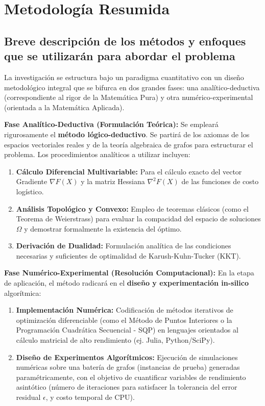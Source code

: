 \section{Metodología Resumida}

\subsection{Breve descripción de los métodos y enfoques que se utilizarán para abordar el problema}
La investigación se estructura bajo un paradigma cuantitativo con un diseño metodológico integral que se bifurca en dos grandes fases: una analítico-deductiva (correspondiente al rigor de la Matemática Pura) y otra numérico-experimental (orientada a la Matemática Aplicada).

\textbf{Fase Analítico-Deductiva (Formulación Teórica):}
Se empleará rigurosamente el \textbf{método lógico-deductivo}. Se partirá de los axiomas de los espacios vectoriales reales y de la teoría algebraica de grafos para estructurar el problema. Los procedimientos analíticos a utilizar incluyen:
\begin{enumerate}
    \item \textbf{Cálculo Diferencial Multivariable:} Para el cálculo exacto del vector Gradiente $\nabla F(X)$ y la matriz Hessiana $\nabla^2 F(X)$ de las funciones de costo logístico.
    \item \textbf{Análisis Topológico y Convexo:} Empleo de teoremas clásicos (como el Teorema de Weierstrass) para evaluar la compacidad del espacio de soluciones $\Omega$ y demostrar formalmente la existencia del óptimo.
    \item \textbf{Derivación de Dualidad:} Formulación analítica de las condiciones necesarias y suficientes de optimalidad de Karush-Kuhn-Tucker (KKT).
\end{enumerate}

\textbf{Fase Numérico-Experimental (Resolución Computacional):}
En la etapa de aplicación, el método radicará en el \textbf{diseño y experimentación in-silico} algorítmica:
\begin{enumerate}
    \item \textbf{Implementación Numérica:} Codificación de métodos iterativos de optimización diferenciable (como el Método de Puntos Interiores o la Programación Cuadrática Secuencial - SQP) en lenguajes orientados al cálculo matricial de alto rendimiento (ej. Julia, Python/SciPy).
    \item \textbf{Diseño de Experimentos Algorítmicos:} Ejecución de simulaciones numéricas sobre una batería de grafos (instancias de prueba) generadas paramétricamente, con el objetivo de cuantificar variables de rendimiento asintótico (número de iteraciones para satisfacer la tolerancia del error residual $\epsilon$, y costo temporal de CPU).
\end{enumerate}

